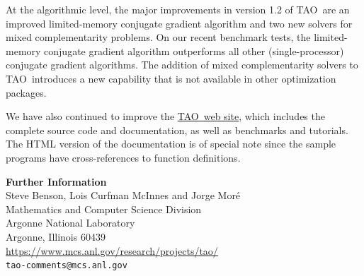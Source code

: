 \documentclass[11pt]{article}
\newcommand{\tao} {\mbox{\sf \footnotesize TAO}}
\begin{document}
\clearpage

At the algorithmic level, the major improvements in version 1.2 of \tao\
are  an improved limited-memory conjugate gradient algorithm
and two new solvers for mixed  complementarity problems.
On our recent benchmark tests, the 
limited-memory conjugate gradient algorithm outperforms all
other (single-processor) conjugate gradient algorithms.
The addition of mixed complementarity solvers to \tao\
introduces a new capability that is not available in other
optimization packages.

We have also continued to improve the 
\href{https://www.mcs.anl.gov/research/projects/tao/}{\tao\ web site}, which
includes the
complete source code and documentation, as well as benchmarks and tutorials.
The HTML version of the documentation is of special note
since the sample programs have cross-references
to function definitions.


\bigskip

\begin{flushleft}
\textbf{Further Information}\\
\medskip
Steve Benson, Lois Curfman McInnes and Jorge Mor\'{e}\\
Mathematics and Computer Science Division\\
Argonne National Laboratory\\
Argonne, Illinois 60439\\
\medskip
\url{https://www.mcs.anl.gov/research/projects/tao/} \\
\texttt{tao-comments@mcs.anl.gov}
\end{flushleft}
\end{document}
